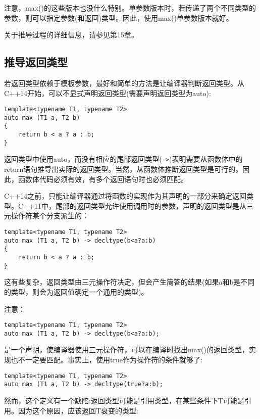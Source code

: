 注意，max()的这些版本也没什么特别。单参数版本时，若传递了两个不同类型的参数，则可以指定参数(和返回)类型。因此，使用max()单参数版本就好。

关于推导过程的详细信息，请参见第15章。

\subsection{推导返回类型}

若返回类型依赖于模板参数，最好和简单的方法是让编译器判断返回类型。从C++14开始，可以不显式声明返回类型(需要声明返回类型为auto):

\begin{lstlisting}[style=styleCXX]
template<typename T1, typename T2>
auto max (T1 a, T2 b)
{
	return b < a ? a : b;
}
\end{lstlisting}

返回类型中使用auto，而没有相应的尾部返回类型(\texttt{->})表明需要从函数体中的return语句推导出实际的返回类型。当然，从函数体推断返回类型是可行的。因此，函数体代码必须有效，有多个返回语句时也必须匹配。

C++14之前，只能让编译器通过将函数的实现作为其声明的一部分来确定返回类型。C++11中，尾部的返回类型允许使用调用时的参数，声明的返回类型是从三元操作符某个分支派生的：

\begin{lstlisting}[style=styleCXX]
template<typename T1, typename T2>
auto max (T1 a, T2 b) -> decltype(b<a?a:b)
{
	return b < a ? a : b;
}
\end{lstlisting}

这有些复杂，返回类型由三元操作符决定，但会产生简答的结果(如果a和b是不同的类型，则会为返回值确定一个通用的类型)。

注意：

\begin{lstlisting}[style=styleCXX]
template<typename T1, typename T2>
auto max (T1 a, T2 b) -> decltype(b<a?a:b);
\end{lstlisting}

是一个声明，使编译器使用三元操作符，可以在编译时找出max()的返回类型，实现也不一定要匹配。事实上，使用true作为操作符的条件就够了:

\begin{lstlisting}[style=styleCXX]
template<typename T1, typename T2>
auto max (T1 a, T2 b) -> decltype(true?a:b);
\end{lstlisting}

然而，这个定义有一个缺陷:返回类型可能是引用类型，在某些条件下T可能是引用。因为这个原因，应该返回T衰变的类型:

